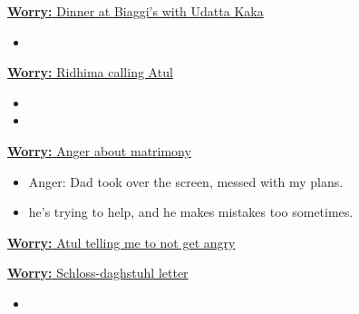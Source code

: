 \documentclass[11pt]{article}
\newcommand{\newWorry}[1]{\underline{\textbf{Worry:} #1} }
\begin{document}
\newWorry{Dinner at Biaggi's with Udatta Kaka}
\begin{itemize}
\item 
\end{itemize}  

\newWorry{Ridhima calling Atul} 
\begin{itemize} 
\item 
\item 
\end{itemize} 

\newWorry{ Anger about matrimony } 
\begin{itemize} 
\item Anger: Dad took over the screen, messed with my plans. 
\item he's trying to help, and he makes mistakes too sometimes. 
\end{itemize} 


\newWorry{ Atul telling me to not get angry }

\newWorry{Schloss-daghstuhl letter} 




\begin{itemize} 
\item \tiny 
\end{itemize} 


\newpage 
\end{document}
